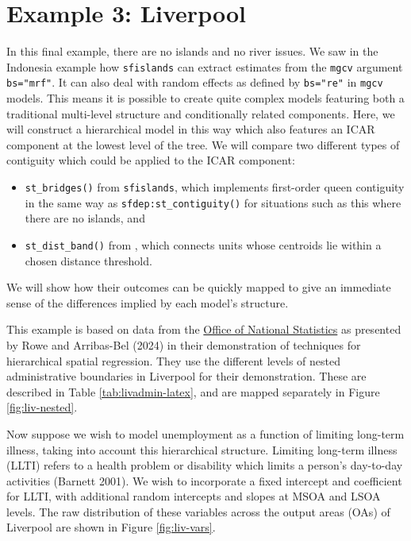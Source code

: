 \hypertarget{example-3-liverpool}{%
\section{Example 3: Liverpool}\label{example-3-liverpool}}

In this final example, there are no islands and no river issues. We saw in the Indonesia example how \texttt{sfislands} can extract estimates from the \texttt{mgcv} argument \texttt{bs="mrf"}. It can also deal with random effects as defined by \texttt{bs="re"} in \texttt{mgcv} models. This means it is possible to create quite complex models featuring both a traditional multi-level structure and conditionally related components. Here, we
will construct a hierarchical model in this way which also features an ICAR component at the lowest level of the tree. We will
compare two different types of contiguity which could be applied to the ICAR component:

\begin{itemize}
\tightlist
\item
  \texttt{st\_bridges()} from \texttt{sfislands}, which implements first-order queen contiguity in the same way as \texttt{sfdep:st\_contiguity()} for situations such as this where there are no islands, and
\item
  \texttt{st\_dist\_band()} from , which connects units whose centroids lie within a chosen distance threshold.
\end{itemize}

We will show how their outcomes can be quickly mapped to give an immediate sense of the differences implied by each model's structure.

This example is based on data from the \href{https://www.nomisweb.co.uk/home/census2001.asp}{Office of National Statistics} as presented by Rowe and Arribas-Bel (2024) in their demonstration of techniques for hierarchical spatial regression. They use the different levels of nested administrative boundaries in Liverpool for their demonstration. These are described in Table \ref{tab:livadmin-latex}, and are mapped separately in Figure \ref{fig:liv-nested}.

Now suppose we wish to model unemployment as a function of limiting long-term
illness, taking into account this hierarchical structure. Limiting long-term illness (LLTI) refers to a health problem or disability which limits a person's day-to-day activities (Barnett 2001). We wish to incorporate a fixed intercept and coefficient for LLTI, with additional random intercepts and slopes at MSOA and LSOA levels. The raw distribution of these variables across the output areas (OAs) of Liverpool are shown in Figure
\ref{fig:liv-vars}.


